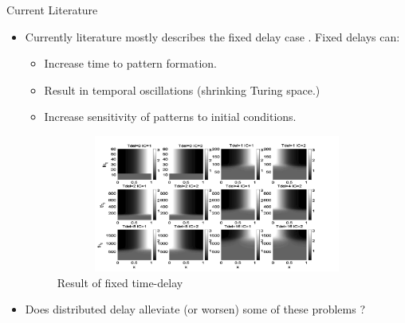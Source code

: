 \documentclass{beamer}
\begin{document}
\begin{frame}{Current Literature}

    \begin{itemize}
        \item Currently literature mostly describes the fixed delay case \cite{gaffmonk,paper1,paper2}. Fixed delays can:
        \begin{itemize}
            \item Increase time to pattern formation.
            \item Result in temporal oscillations (shrinking Turing space.)
            \item Increase sensitivity of patterns to initial conditions.
    \end{itemize}

\begin{figure}[H]
        \centering
        \includegraphics[width=11cm,height=4.5cm]{picDelay.png}
        \caption{Result of fixed time-delay \cite{gaffmonk}}
\end{figure}

\item Does distributed delay alleviate (or worsen) some of these problems ?
\end{itemize}

\end{frame}
\end{document}
